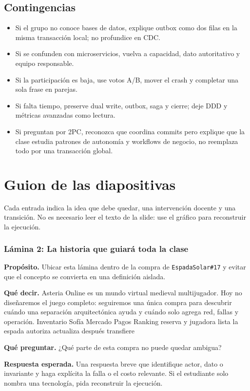 \documentclass[variant=docente,cover=institutional,mode=screen]{ua-engineering-v6-article}
\begin{document}
\subsection{Contingencias}
\begin{itemize}
\item Si el grupo no conoce bases de datos, explique outbox como dos filas en la misma transacción local; no profundice en CDC.
\item Si se confunden con microservicios, vuelva a capacidad, dato autoritativo y equipo responsable.
\item Si la participación es baja, use votos A/B, mover el crash y completar una sola frase en parejas.
\item Si falta tiempo, preserve dual write, outbox, saga y cierre; deje DDD y métricas avanzadas como lectura.
\item Si preguntan por 2PC, reconozca que coordina commits pero explique que la clase estudia patrones de autonomía y workflows de negocio, no reemplaza todo por una transacción global.
\end{itemize}

\section{Guion de las diapositivas}
Cada entrada indica la idea que debe quedar, una intervención docente y una transición. No es necesario leer el texto de la slide: use el gráfico para reconstruir la ejecución.
\subsubsection*{Lámina 2: La historia que guiará toda la clase}
\textbf{Propósito.} Ubicar esta lámina dentro de la compra de \texttt{EspadaSolar\#17} y evitar que el concepto se convierta en una definición aislada.

\textbf{Qué decir.} Asteria Online es un mundo virtual medieval multijugador. Hoy no diseñaremos el juego completo: seguiremos una única compra para descubrir cuándo una separación arquitectónica ayuda y cuándo solo agrega red, fallas y operación. Inventario Sofía Mercado Pagos Ranking reserva y jugadora lista la espada autoriza actualiza después transfiere

\textbf{Qué preguntar.} ¿Qué parte de esta compra no puede quedar ambigua?

\textbf{Respuesta esperada.} Una respuesta breve que identifique actor, dato o invariante y haga explícita la falla o el costo relevante. Si el estudiante solo nombra una tecnología, pida reconstruir la ejecución.
\end{document}
